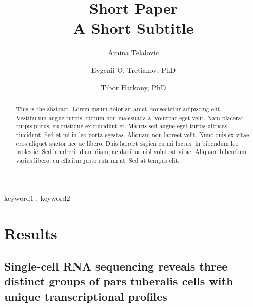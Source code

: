 \documentclass[
  number,
  preprint]{elsarticle}
\begin{document}
\begin{frontmatter}
\title{Short Paper \\\large{A Short Subtitle} }
\author[1]{Amina Telalovic%
%
}
\author[1]{Evgenii O. Tretiakov, PhD%
%
}
\author[1,2]{Tibor Harkany, PhD%
%
}





        
\begin{abstract}
This is the abstract. Lorem ipsum dolor sit amet, consectetur adipiscing
elit. Vestibulum augue turpis, dictum non malesuada a, volutpat eget
velit. Nam placerat turpis purus, eu tristique ex tincidunt et. Mauris
sed augue eget turpis ultrices tincidunt. Sed et mi in leo porta
egestas. Aliquam non laoreet velit. Nunc quis ex vitae eros aliquet
auctor nec ac libero. Duis laoreet sapien eu mi luctus, in bibendum leo
molestie. Sed hendrerit diam diam, ac dapibus nisl volutpat vitae.
Aliquam bibendum varius libero, eu efficitur justo rutrum at. Sed at
tempus elit.
\end{abstract}





\begin{keyword}
    keyword1 \sep 
    keyword2
\end{keyword}
\end{frontmatter}
    

\section{Results}\label{results}

\subsection{\texorpdfstring{\textbf{Single-cell RNA sequencing reveals
three distinct groups of pars tuberalis cells with unique
transcriptional
profiles}}{Single-cell RNA sequencing reveals three distinct groups of pars tuberalis cells with unique transcriptional profiles}}\label{single-cell-rna-sequencing-reveals-three-distinct-groups-of-pars-tuberalis-cells-with-unique-transcriptional-profiles}
\end{document}
